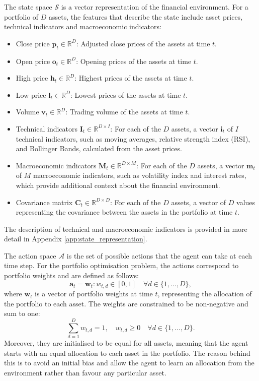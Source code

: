 The state space $\mathcal{S}$ is a vector representation of the financial environment. For a portfolio of $D$ assets, the features that describe the state include asset prices, technical indicators and macroeconomic indicators: 
\begin{itemize}
    \item Close price $\mathbf{p}_t \in \mathbb{R}^D$: Adjusted close prices of the assets at time $t$.
    \item Open price $\mathbf{o}_t \in \mathbb{R}^D$: Opening prices of the assets at time $t$.
    \item High price $\mathbf{h}_t \in \mathbb{R}^D$: Highest prices of the assets at time $t$.
    \item Low price $\mathbf{l}_t \in \mathbb{R}^D$: Lowest prices of the assets at time $t$.
    \item Volume $\mathbf{v}_t \in \mathbb{R}^D$: Trading volume of the assets at time $t$.
    \item Technical indicators $\mathbf{I}_t \in \mathbb{R}^{D \times I}$: For each of the $D$ assets, a vector $\mathbf{i}_t$ of $I$ technical indicators, such as moving averages, relative strength index (RSI), and Bollinger Bands, calculated from the asset prices.
    \item Macroeconomic indicators $\mathbf{M}_t \in \mathbb{R}^{D \times M}$: For each of the $D$ assets, a vector $\mathbf{m}_t$ of $M$ macroeconomic indicators, such as volatility index and interest rates, which provide additional context about the financial environment.
    \item Covariance matrix $\mathbf{C}_t \in \mathbb{R}^{D \times D}$: For each of the $D$ assets, a vector of $D$ values representing the covariance between the assets in the portfolio at time $t$.
\end{itemize}

The description of technical and macroeconomic indicators is provided in more detail in Appendix \ref{app:state_representation}.

The action space $\mathcal{A}$ is the set of possible actions that the agent can take at each time step. For the portfolio optimisation problem, the actions correspond to portfolio weights and are defined as follows:
\begin{equation}
    \mathbf{a}_t = \mathbf{w}_t : w_{t,d} \in [0, 1] \quad \forall d \in \{1, \ldots, D\},
\end{equation}
where $\mathbf{w}_t$ is a vector of portfolio weights at time $t$, representing the allocation of the portfolio to each asset. The weights are constrained to be non-negative and sum to one:
\begin{equation}
    \sum_{d=1}^D w_{t,d} = 1, \quad w_{t,d} \geq 0 \quad \forall d \in \{1, \ldots, D\}.
\end{equation}
Moreover, they are initialised to be equal for all assets, meaning that the agent starts with an equal allocation to each asset in the portfolio. The reason behind this is to avoid an initial bias and allow the agent to learn an allocation from the environment rather than favour any particular asset.

